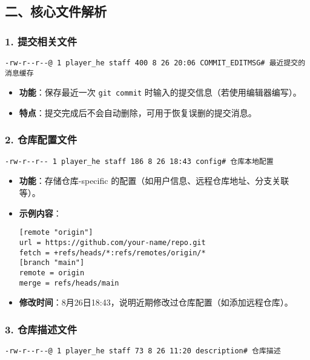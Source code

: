 \subsection{二、核心文件解析}
\subsubsection{1. 提交相关文件}
\begin{verbatim}
-rw-r--r--@ 1 player_he staff 400 8 26 20:06 COMMIT_EDITMSG# 最近提交的消息缓存
\end{verbatim}

\begin{itemize}[leftmargin=*, nosep]
    \item \textbf{功能}：保存最近一次 \texttt{git commit} 时输入的提交信息（若使用编辑器编写）。
    \item \textbf{特点}：提交完成后不会自动删除，可用于恢复误删的提交消息。
\end{itemize}

\subsubsection{2. 仓库配置文件}
\begin{verbatim}
-rw-r--r-- 1 player_he staff 186 8 26 18:43 config# 仓库本地配置
\end{verbatim}

\begin{itemize}[leftmargin=*, nosep]
    \item \textbf{功能}：存储仓库-specific 的配置（如用户信息、远程仓库地址、分支关联等）。
    \item \textbf{示例内容}：
    \begin{verbatim}
[remote "origin"]
url = https://github.com/your-name/repo.git
fetch = +refs/heads/*:refs/remotes/origin/*
[branch "main"]
remote = origin
merge = refs/heads/main
    \end{verbatim}
    \item \textbf{修改时间}：8月26日18:43，说明近期修改过仓库配置（如添加远程仓库）。
\end{itemize}

\subsubsection{3. 仓库描述文件}
\begin{verbatim}
-rw-r--r--@ 1 player_he staff 73 8 26 11:20 description# 仓库描述
\end{verbatim}

